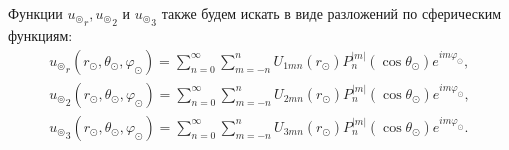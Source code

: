 Функции ${u_\circledcirc}_r, {u_\circledcirc}_2$ и ${u_\circledcirc}_3$ также будем искать в виде разложений по сферическим функциям:
\begin{equation}\label{eq_uru2u3}
\begin{split}
{u_\circledcirc}_r(r_\odot, \theta_\odot, \varphi_\odot) = \sum\limits_{n=0}^\infty\sum\limits_{m=-n}^n U_{1mn}(r_\odot)P_n^{\lvert m\rvert}(\cos\theta_\odot) e^{im\varphi_\odot},\\
{u_\circledcirc}_2(r_\odot, \theta_\odot, \varphi_\odot) = \sum\limits_{n=0}^\infty\sum\limits_{m=-n}^n U_{2mn}(r_\odot)P_n^{\lvert m\rvert}(\cos\theta_\odot) e^{im\varphi_\odot},\\
{u_\circledcirc}_3(r_\odot, \theta_\odot, \varphi_\odot) = \sum\limits_{n=0}^\infty\sum\limits_{m=-n}^n U_{3mn}(r_\odot)P_n^{\lvert m\rvert}(\cos\theta_\odot) e^{im\varphi_\odot}.\\
\end{split}
\end{equation}

